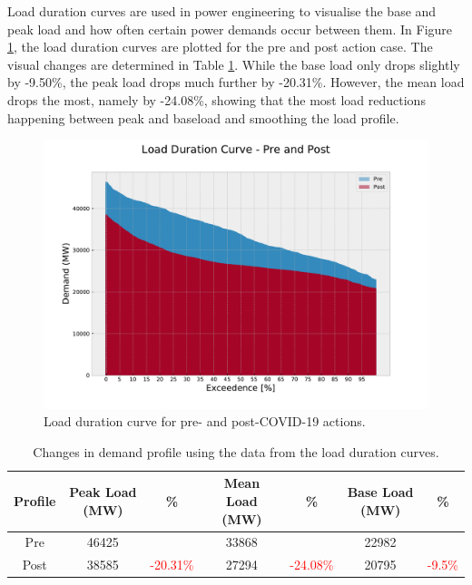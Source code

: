 \documentclass[energies,article,submit,moreauthors,pdftex]{Definitions/mdpi}
\begin{document}
Load duration curves are used in power engineering to visualise the base and peak load and how often certain power demands occur between them. In Figure \ref{fig:load_duration}, the load duration curves are plotted for the pre and post action case. The visual changes are determined in Table \ref{table:load-duration}. While the base load only drops slightly by -9.50\%, the peak load drops much further by -20.31\%. However, the mean load drops the most, namely by -24.08\%, showing that the most load reductions happening between peak and baseload and smoothing the load profile.  

\begin{figure}[]
\centering
\hspace{-25pt}\includegraphics[width=9 cm]{Graphics/Load_duration_curve.pdf}
\caption{Load duration curve for pre- and post-COVID-19 actions.}\label{fig:load_duration}
\end{figure}  

\begin{table}[H]
\caption{Changes in demand profile using the data from the load duration curves. }
\centering
\begin{tabular}{ccccccc}
\toprule
\textbf{Profile} & \textbf{Peak Load (MW)}	& \textbf{\%} & \textbf{ Mean Load (MW)}	& \textbf{\%}	& \textbf{ Base Load (MW)}	& \textbf{\%}\\
\midrule
Pre	& 46425 & & 33868 & & 22982 &  \\
Post & 38585 & \textcolor{red}{-20.31\%} & 27294 & \textcolor{red}{-24.08\%} & 20795 & \textcolor{red}{-9.5\%} \\

\bottomrule
\end{tabular}
\label{table:load-duration}
\end{table}
\end{document}
